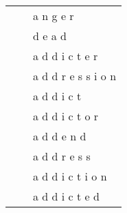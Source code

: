 \documentclass[11pt]{article}
\begin{document}
\begin{spacing}{1}
\begin{table}[!htbp]
\begin{tabular}{p{8cm} l l}
                                                                                                 &                   & a n g e r               \\
                                                                                                 &                   & d e a d                 \\
                                                                                                 &                   & a d d i c t e r         \\
                                                                                                 &                   & a d d r e s s i o n     \\
                                                                                                 &                   & a d d i c t             \\
                                                                                                 &                   & a d d i c t o r         \\
                                                                                                 &                   & a d d e n d             \\
                                                                                                 &                   & a d d r e s s           \\
                                                                                                 &                   & a d d i c t i o n       \\
                                                                                                 &                   & a d d i c t e d        
\end{tabular}
\label{5_epoch_char}
\end{table}


\end{spacing}
\end{document}
